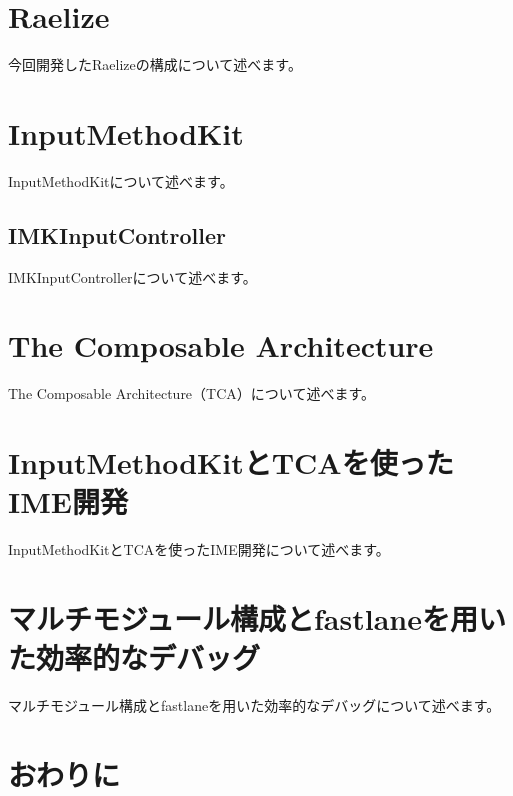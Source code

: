 \documentclass[uplatex,a4j,12pt]{jsarticle}
\begin{document}

\section{Raelize}\label{sec:constract}
今回開発したRaelizeの構成について述べます。

\section{InputMethodKit}\label{sec:abount_inputmethodkit}
InputMethodKitについて述べます。

\subsection{IMKInputController}\label{sec:imkInput_controller}
IMKInputControllerについて述べます。

\section{The Composable Architecture}\label{sec:the_composable_architecture}
The Composable Architecture（TCA）について述べます。

\section{InputMethodKitとTCAを使ったIME開発}\label{sec:use_imk_and_tca}
InputMethodKitとTCAを使ったIME開発について述べます。

\section{マルチモジュール構成とfastlaneを用いた効率的なデバッグ}\label{sec:multi_module_and_fastlane}
マルチモジュール構成とfastlaneを用いた効率的なデバッグについて述べます。

\section{おわりに}\label{sec:conclusion}

 
 
\end{document}
